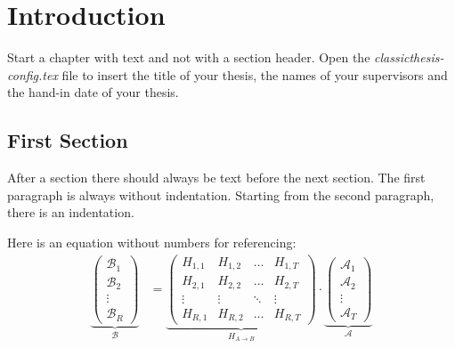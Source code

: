 \chapter{Introduction}\label{ch:introduction}
\glsresetall %

Start a chapter with text and not with a section header. Open the
\emph{classicthesis-config.tex} file to insert the title of your thesis, the
names of your supervisors and the hand-in date of your thesis.

\section{First Section}
\label{sec:first_section}

After a section there should always be text before the next section. The first
paragraph is always without indentation. Starting from the second paragraph,
there is an indentation.

Here is an equation without numbers for referencing:
\begin{align*}
\underbrace{\begin{pmatrix}\mathcal{B}_1\\\mathcal{B}_2\\\vdots\\\mathcal{B}_R\end{pmatrix}}_\mathcal{B} &= \underbrace{\begin{pmatrix}H_{1,1} & H_{1,2} & \hdots & H_{1,T}\\H_{2,1} & H_{2,2} & \hdots & H_{2,T}\\\vdots & \vdots & \ddots & \vdots\\H_{R,1} & H_{R,2} & \hdots & H_{R,T}\end{pmatrix}}_{H_{A\rightarrow B}}\cdot \underbrace{\begin{pmatrix}\mathcal{A}_1\\\mathcal{A}_2\\\vdots\\\mathcal{A}_T\end{pmatrix}}_\mathcal{A}
\end{align*}


